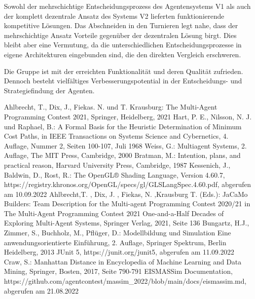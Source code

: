 \documentclass[runningheads]{llncs}
\begin{document}
	Sowohl der mehrschichtige Entscheidungsprozess des Agentensystems V1 als auch der komplett dezentrale Ansatz des Systems V2 lieferten funktionierende kompetitive Lösungen. Das Abschneiden in den Turnieren legt nahe, dass der mehrschichtige Ansatz Vorteile gegenüber der dezentralen Lösung birgt. Dies bleibt aber eine Vermutung, da die unterschiedlichen Entscheidungsprozesse in eigene Architekturen eingebunden sind, die den direkten Vergleich erschweren.
	
	Die Gruppe ist mit der erreichten Funktionalität und deren Qualität zufrieden. Dennoch besteht vielfältiges Verbesserungspotential in der Entscheidungs- und Strategiefindung der Agenten.
	
	\newpage\begin{thebibliography}{8}
		Ahlbrecht, T., Dix, J., Fiekas. N. und T. Krausburg: The Multi-Agent Programming Contest 2021, Springer, Heidelberg, 2021
		Hart, P. E., Nilsson, N. J. und Raphael, B.: A Formal Basis for the Heuristic Determination of Minimum Cost Paths, in IEEE Transactions on Systems Science and Cybernetics, 4. Auflage, Nummer 2, Seiten 100-107, Juli 1968
		Weiss, G.: Multiagent Systems, 2. Auflage, The MIT Press, Cambridge, 2000
		Bratman, M.: Intention, plans, and practical reason, Harvard University Press, Cambridge, 1987
		Kessenich, J., Baldwin, D., Rost, R.: The OpenGL® Shading Language, Version 4.60.7, https://registry.khronos.org/OpenGL/specs/gl/GLSLangSpec.4.60.pdf, abgerufen am 10.09.2022
		Ahlbrecht,T. , Dix, J. , Fiekas, N. ,Krausburg T. (Eds.): JaCaMo Builders: Team Description for the Multi-agent Programming Contest 2020/21  in The Multi-Agent Programming Contest 2021 One-and-a-Half Decades of Exploring Multi-Agent Systems, Springer Verlag, 2021, Seite 136
		Bungartz, H.J., Zimmer, S., Buchholz, M., Pflüger, D.: Modellbildung und Simulation Eine anwendungsorientierte Einführung, 2. Auflage, Springer Spektrum, Berlin Heidelberg, 2013
		JUnit 5, https://junit.org/junit5, abgerufen am 11.09.2022
		Craw, S.: Manhattan Distance in Encyclopedia of Machine Learning and Data Mining, Springer, Bosten, 2017, Seite 790-791
		EISMASSim Documentation, \\ https://github.com/agentcontest/massim\_2022/blob/main/docs/eismassim.md, abgerufen am 21.08.2022
	\end{thebibliography}
\end{document}
